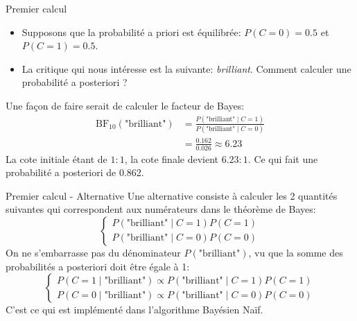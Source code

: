 \documentclass[10pt]{beamer}  %
\begin{document}
\begin{frame}{Premier calcul}
	\begin{itemize}
		\item  Supposons que la probabilité a priori est équilibrée: $P(C = 0) = 0.5$ et $P(C = 1) = 0.5$.
		\item La critique qui nous intéresse est la suivante: \textit{brilliant}. Comment calculer une probabilité a posteriori ?
	\end{itemize}
	\pause
	Une façon de faire serait de calculer le facteur de Bayes:
	\begin{equation}
		\begin{aligned}
			\text{BF}_{10}(\text{"brilliant"}) 
			&= \frac{P(\text{"brilliant"} \mid C = 1)}{P(\text{"brilliant"} \mid C = 0)} \\
			&= \frac{0.162}{0.026} \approx 6.23
		\end{aligned}
		\nonumber
	\end{equation}
	\pause
	La cote initiale étant de $1:1$, la cote finale devient $6.23:1$. Ce qui fait une probabilité a posteriori de 0.862.
\end{frame}

\begin{frame}{Premier calcul - Alternative}
	Une alternative consiste à calculer les 2 quantités suivantes qui correspondent aux numérateurs dans le théorème de Bayes:
	\begin{equation}
		\begin{cases}
			P(\text{"brilliant"} \mid C = 1) P(C=1) \\
			P(\text{"brilliant"} \mid C = 0) P(C=0)
		\end{cases}
		\nonumber
	\end{equation}
	\pause
	On ne s'embarrasse pas du dénominateur $P(\text{"brilliant"})$, vu que la somme des probabilités a posteriori doit être égale à 1:
	\begin{equation}
		\begin{cases}
			P(C = 1 \mid \text{"brilliant"}) \propto P(\text{"brilliant"} \mid C = 1) P(C=1) \\
			P(C = 0 \mid \text{"brilliant"}) \propto P(\text{"brilliant"} \mid C = 0) P(C=0)
		\end{cases}
		\nonumber
	\end{equation}
	C'est ce qui est implémenté dans l'algorithme Bayésien Naïf.
\end{frame}
\end{document}
